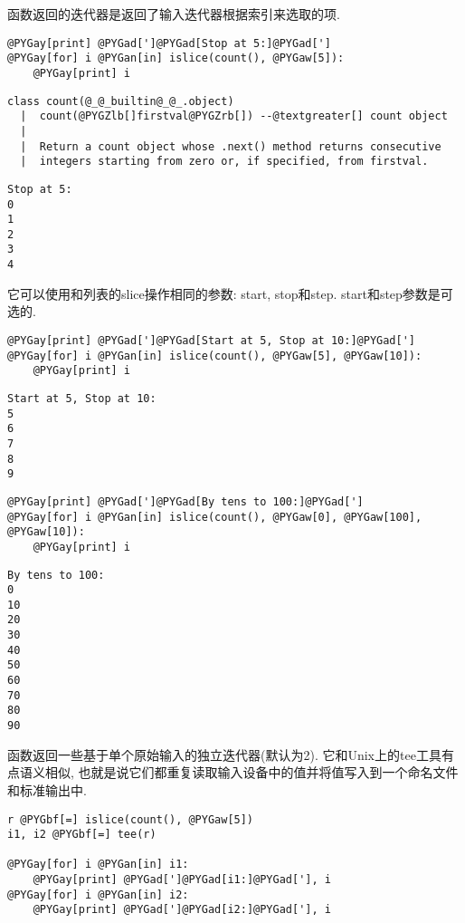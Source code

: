 \documentclass[a4paper,10pt,english]{manual}
\begin{document}
 函数返回的迭代器是返回了输入迭代器根据索引来选取的项.

\begin{Verbatim}[commandchars=@\[\]]
@PYGay[print] @PYGad[']@PYGad[Stop at 5:]@PYGad[']
@PYGay[for] i @PYGan[in] islice(count(), @PYGaw[5]):
    @PYGay[print] i
\end{Verbatim}

\begin{Verbatim}[commandchars=@\[\]]
class count(@_@_builtin@_@_.object)
  |  count(@PYGZlb[]firstval@PYGZrb[]) --@textgreater[] count object
  |
  |  Return a count object whose .next() method returns consecutive
  |  integers starting from zero or, if specified, from firstval.
\end{Verbatim}

\begin{Verbatim}[commandchars=@\[\]]
Stop at 5:
0
1
2
3
4
\end{Verbatim}

它可以使用和列表的slice操作相同的参数: start, stop和step. start和step参数是可选的.

\begin{Verbatim}[commandchars=@\[\]]
@PYGay[print] @PYGad[']@PYGad[Start at 5, Stop at 10:]@PYGad[']
@PYGay[for] i @PYGan[in] islice(count(), @PYGaw[5], @PYGaw[10]):
    @PYGay[print] i
\end{Verbatim}

\begin{Verbatim}[commandchars=@\[\]]
Start at 5, Stop at 10:
5
6
7
8
9
\end{Verbatim}

\begin{Verbatim}[commandchars=@\[\]]
@PYGay[print] @PYGad[']@PYGad[By tens to 100:]@PYGad[']
@PYGay[for] i @PYGan[in] islice(count(), @PYGaw[0], @PYGaw[100], @PYGaw[10]):
    @PYGay[print] i
\end{Verbatim}

\begin{Verbatim}[commandchars=@\[\]]
By tens to 100:
0
10
20
30
40
50
60
70
80
90
\end{Verbatim}

 函数返回一些基于单个原始输入的独立迭代器(默认为2). 它和Unix上的tee工具有点语义相似, 也就是说它们都重复读取输入设备中的值并将值写入到一个命名文件和标准输出中.

\begin{Verbatim}[commandchars=@\[\]]
r @PYGbf[=] islice(count(), @PYGaw[5])
i1, i2 @PYGbf[=] tee(r)

@PYGay[for] i @PYGan[in] i1:
    @PYGay[print] @PYGad[']@PYGad[i1:]@PYGad['], i
@PYGay[for] i @PYGan[in] i2:
    @PYGay[print] @PYGad[']@PYGad[i2:]@PYGad['], i
\end{Verbatim}
\end{document}
